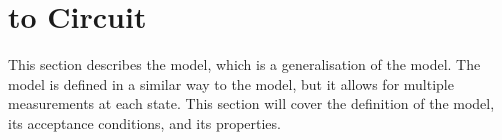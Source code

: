 \section{ to Circuit}
\label{sec:moqfa}

This section describes the  model, which is a generalisation of the  model. The  model is defined in a similar way to the  model, but it allows for multiple measurements at each state. This section will cover the definition of the  model, its acceptance conditions, and its properties.